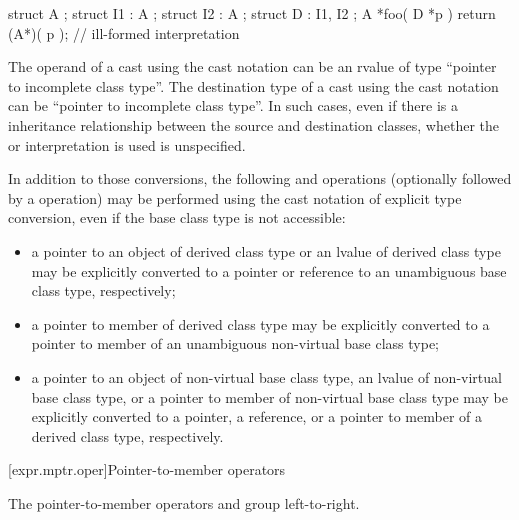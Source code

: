 \begin{codeblock}
struct A {};
struct I1 : A {};
struct I2 : A {};
struct D : I1, I2 {};
A *foo( D *p ) {
	return (A*)( p );	// ill-formed  interpretation
}
\end{codeblock}

\exitexampleb

\pnum
{}%
The operand of a cast using the cast notation can be an rvalue of type
``pointer to incomplete class type''. The destination type of a cast
using the cast notation can be ``pointer to incomplete class type''. In
such cases, even if there is a inheritance relationship between the
source and destination classes, whether the  or
 interpretation is used is unspecified.

\pnum
In addition to those conversions, the following  and
 operations (optionally followed by a
 operation) may be performed using the cast notation
of explicit type conversion, even if the base class type is not accessible:

\begin{itemize}
\item a pointer to an object of derived class type or an lvalue of
derived class type may be explicitly converted to a pointer or
reference to an unambiguous base class type, respectively;

\item a pointer to member of derived class type may be explicitly
converted to a pointer to member of an unambiguous non-virtual base
class type;

\item a pointer to an object of non-virtual base class type, an lvalue
of non-virtual base class type, or a pointer to member of non-virtual
base class type may be explicitly converted to a pointer, a reference,
or a pointer to member of a derived class type, respectively.
\end{itemize}

[expr.mptr.oper]{Pointer-to-member operators}

\pnum
{}%
%
%
%
%
%
The pointer-to-member operators \tcode{->*} and  group
left-to-right.

